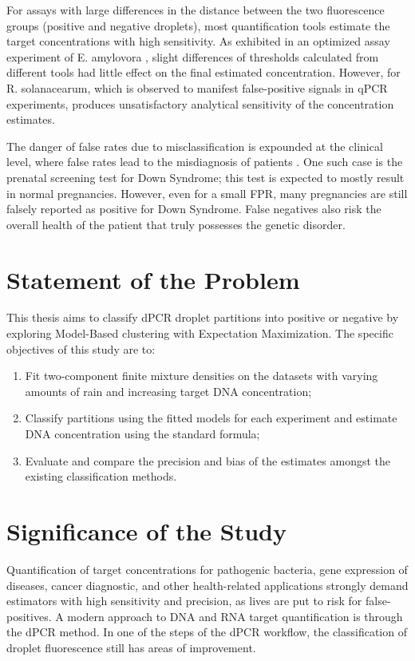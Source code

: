 For assays with large differences in the distance between the two fluorescence groups (positive and negative droplets), most quantification tools estimate the target concentrations with high sensitivity. As exhibited in an optimized assay experiment of E. amylovora \cite{Dreo2014}, slight differences of thresholds calculated from different tools had little effect on the final estimated concentration. However, for R. solanacearum, which is observed to manifest false-positive signals in qPCR experiments, produces unsatisfactory analytical sensitivity of the concentration estimates. 



The danger of false rates due to misclassification is expounded at the clinical level, where false rates lead to the misdiagnosis of patients \cite{Tzonev}. One such case is the prenatal screening test for Down Syndrome; this test is expected to mostly result in normal pregnancies. However, even for a small FPR, many pregnancies are still falsely reported as positive for Down Syndrome. False negatives also risk the overall health of the patient that truly possesses the genetic disorder.




\section{Statement of the Problem}
\label{sec:statementprob}

This thesis aims to classify dPCR droplet partitions into positive or negative by exploring Model-Based clustering with Expectation Maximization. The specific objectives of this study are to:
\begin{enumerate}
    \item Fit two-component finite mixture densities on the datasets with varying amounts of rain and increasing target DNA concentration;
    \item Classify partitions using the fitted models for each experiment and estimate DNA concentration using the standard formula;
    \item Evaluate and compare the precision and bias of the estimates amongst the existing classification methods. 
\end{enumerate}

\section{Significance of the Study}
\label{sec:significancestudy}
Quantification of target concentrations for pathogenic bacteria, gene expression of diseases, cancer diagnostic, and other health-related applications strongly demand estimators with high sensitivity and precision, as lives are put to risk for false-positives. A modern approach to DNA and RNA target quantification is through the dPCR method. In one of the steps of the dPCR workflow, the classification of droplet fluorescence still has areas of improvement. 


